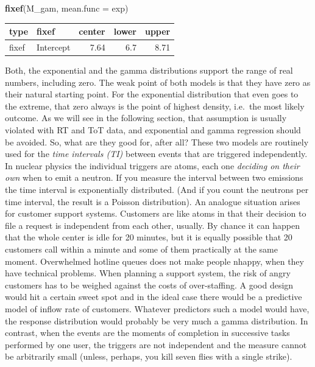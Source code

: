 \documentclass[]{svmono}
\newenvironment{Shaded}{\begin{snugshade}}{\end{snugshade}}
\newcommand{\KeywordTok}[1]{\textcolor[rgb]{0.13,0.29,0.53}{\textbf{#1}}}
\newcommand{\DataTypeTok}[1]{\textcolor[rgb]{0.13,0.29,0.53}{#1}}
\newcommand{\NormalTok}[1]{#1}
\theoremstyle{definition}
\theoremstyle{definition}
\theoremstyle{definition}
\theoremstyle{remark}
\begin{document}
\begin{Shaded}
\begin{Highlighting}[]
\KeywordTok{fixef}\NormalTok{(M_gam, }\DataTypeTok{mean.func =}\NormalTok{ exp)}
\end{Highlighting}
\end{Shaded}

\begin{longtable}[]{@{}llrrr@{}}
\toprule
type & fixef & center & lower & upper\tabularnewline
\midrule
\endhead
fixef & Intercept & 7.64 & 6.7 & 8.71\tabularnewline
\bottomrule
\end{longtable}

Both, the exponential and the gamma distributions support the range of
real numbers, including zero. The weak point of both models is that they
have zero as their natural starting point. For the exponential
distribution that even goes to the extreme, that zero always is the
point of highest density, i.e.~the most likely outcome. As we will see
in the following section, that assumption is usually violated with RT
and ToT data, and exponential and gamma regression should be avoided.
So, what are they good for, after all? These two models are routinely
used for the \emph{time intervals (TI)} between events that are
triggered independently. In nuclear physics the individual triggers are
atoms, each one \emph{deciding on their own} when to emit a neutron. If
you measure the interval between two emissions the time interval is
exponentially distributed. (And if you count the neutrons per time
interval, the result is a Poisson distribution). An analogue situation
arises for customer support systems. Customers are like atoms in that
their decision to file a request is independent from each other,
usually. By chance it can happen that the whole center is idle for 20
minutes, but it is equally possible that 20 customers call within a
minute and some of them practically at the same moment. Overwhelmed
hotline queues does not make people nhappy, when they have technical
problems. When planning a support system, the risk of angry customers
has to be weighed against the costs of over-staffing. A good design
would hit a certain sweet spot and in the ideal case there would be a
predictive model of inflow rate of customers. Whatever predictors such a
model would have, the response distribution would probably be very much
a gamma distribution. In contrast, when the events are the moments of
completion in successive tasks performed by one user, the triggers are
not independent and the measure cannot be arbitrarily small (unless,
perhaps, you kill seven flies with a single strike).
\end{document}
